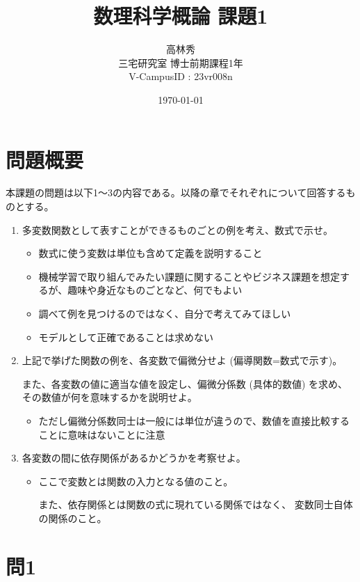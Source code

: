 \documentclass{article}[jsarticle]
\title{数理科学概論 課題1}
\author{高林秀 \\ 三宅研究室 博士前期課程1年 \\ V-CampusID : 23vr008n}
\date{\today}
\begin{document}
\maketitle

\setcounter{section}{-1}

\section{問題概要}
本課題の問題は以下1～3の内容である。以降の章でそれぞれについて回答するものとする。

\begin{enumerate}
    \item 多変数関数として表すことができるものごとの例を考え、数式で示せ。
    \begin {itemize}
    \item 数式に使う変数は単位も含めて定義を説明すること
    \item 機械学習で取り組んでみたい課題に関することやビジネス課題を想定するが、趣味や身近なものごとなど、何でもよい
    \item 調べて例を見つけるのではなく、自分で考えてみてほしい
    \item モデルとして正確であることは求めない
    \end {itemize}

    \item 上記で挙げた関数の例を、各変数で偏微分せよ (偏導関数=数式で示す)。 \par
    また、各変数の値に適当な値を設定し、偏微分係数 (具体的数値) を求め、
    その数値が何を意味するかを説明せよ。
    \begin {itemize}
        \item ただし偏微分係数同士は一般には単位が違うので、数値を直接比較することに意味はないことに注意
    \end {itemize}

    \item 各変数の間に依存関係があるかどうかを考察せよ。
    \begin{itemize}
        \item ここで変数とは関数の入力となる値のこと。\par 
        また、依存関係とは関数の式に現れている関係ではなく、
        変数同士自体の関係のこと。
    \end{itemize}

\end{enumerate}


\section{問1}
\end{document}

